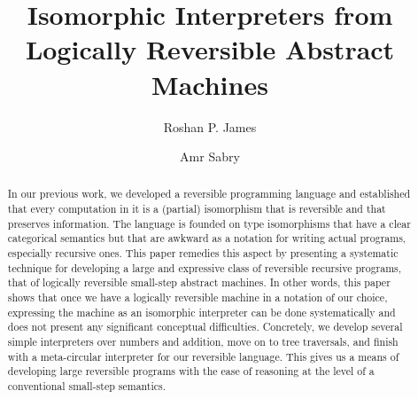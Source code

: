 \documentclass{llncs}
\begin{document}
\title{Isomorphic Interpreters from Logically Reversible Abstract Machines} 
\author{Roshan P. James \and Amr Sabry}
\maketitle

\begin{abstract}
  In our previous work, we developed a reversible programming language and
  established that every computation in it is a (partial) isomorphism that is
  reversible and that preserves information. The language is founded on type
  isomorphisms that have a clear categorical semantics but that are awkward
  as a notation for writing actual programs, especially recursive ones. This
  paper remedies this aspect by presenting a systematic technique for
  developing a large and expressive class of reversible recursive programs,
  that of logically reversible small-step abstract machines. In other words,
  this paper shows that once we have a logically reversible machine in a
  notation of our choice, expressing the machine as an isomorphic interpreter
  can be done systematically and does not present any significant conceptual
  difficulties. Concretely, we develop several simple interpreters over
  numbers and addition, move on to tree traversals, and finish with a
  meta-circular interpreter for our reversible language. This
  gives us a means of developing large reversible programs with the ease of
  reasoning at the level of a conventional small-step semantics.
\end{abstract}
\end{document}
